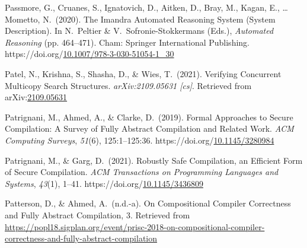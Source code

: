 \documentclass[12pt,twoside]{article}
\begin{document}
{\begin{thebibliography}{1079}
\mdbibitemlabel{}Passmore, G., Cruanes, S., Ignatovich, D., Aitken, D., Bray, M., Kagan, E., … Mometto, N.~(2020). The Imandra Automated Reasoning System (System Description). In N.~Peltier \& V.~Sofronie-Stokkermans (Eds.), \emph{Automated Reasoning} (pp. 464–471). Cham: Springer International Publishing. https://doi.org/\href{https://dx.doi.org/10.1007/978-3-030-51054-1_30}{10.1007/978-3-030-51054-1\_30}%

\mdbibitemlabel{}Patel, N., Krishna, S., Shasha, D., \& Wies, T.~(2021). Verifying Concurrent Multicopy Search Structures. \emph{arXiv:2109.05631 {}[cs]}. Retrieved from arXiv:\href{http://arxiv.org/abs/2109.05631}{2109.05631}%

\mdbibitemlabel{}Patrignani, M., Ahmed, A., \& Clarke, D.~(2019). Formal Approaches to Secure Compilation: A Survey of Fully Abstract Compilation and Related Work. \emph{ACM Computing Surveys}, \emph{51}(6), 125:1–125:36. https://doi.org/\href{https://dx.doi.org/10.1145/3280984}{10.1145/3280984}%

\mdbibitemlabel{}Patrignani, M., \& Garg, D.~(2021). Robustly Safe Compilation, an Efficient Form of Secure Compilation. \emph{ACM Transactions on Programming Languages and Systems}, \emph{43}(1), 1–41. https://doi.org/\href{https://dx.doi.org/10.1145/3436809}{10.1145/3436809}%

\mdbibitemlabel{}Patterson, D., \& Ahmed, A.~(n.d.-a). On Compositional Compiler Correctness and Fully Abstract Compilation, 3. Retrieved from \href{https://popl18.sigplan.org/event/prisc-2018-on-compositional-compiler-correctness-and-fully-abstract-compilation}{{\ttfamily https://\hspace{0pt}popl18.\hspace{0pt}sigplan.\hspace{0pt}org/\hspace{0pt}event/\hspace{0pt}prisc-\hspace{0pt}2018-\hspace{0pt}on-\hspace{0pt}compositional-\hspace{0pt}compiler-\hspace{0pt}correctness-\hspace{0pt}and-\hspace{0pt}fully-\hspace{0pt}abstract-\hspace{0pt}compilation}}%


\end{thebibliography}}
\end{document}
